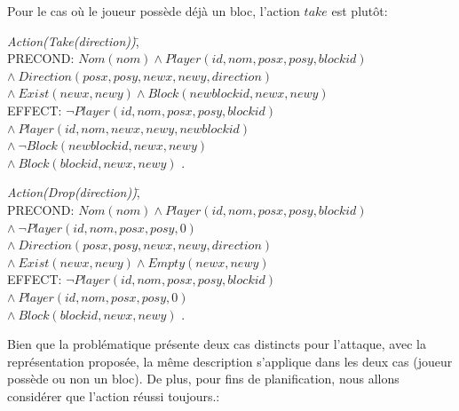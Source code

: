 \documentclass[12pt,english,frenchb,letterpaper]{article}
\begin{document}
Pour le cas où le joueur possède déjà un bloc, l'action $take$ est plutôt:
\begin{tabbing}
\textit{Action}\=\textit{(Take(direction))}\=,\\
\> PRECOND: \> $Nom(nom) \wedge Player(id,nom,posx,posy,blockid)$ \\ 
\> \> $  \wedge \ Direction(posx,posy,newx,newy,direction) $ \\
\> \> $   \wedge \ Exist(newx,newy) \wedge Block(newblockid,newx,newy) $ \\               
\> EFFECT: \>$ \lnot Player(id,nom,posx,posy,blockid) $ \\
\>  \> $\wedge\ Player(id,nom,newx,newy,newblockid)$ \\
\> \> $\wedge\ \lnot Block(newblockid,newx,newy) $ \\
\> \> $\wedge\ Block(blockid,newx,newy) $ .\\
\end{tabbing}

\begin{tabbing}
\textit{Action}\=\textit{(Drop(direction))}\=,\\
\> PRECOND: \> $Nom(nom) \wedge Player(id,nom,posx,posy,blockid)$ \\ 
\> \> $  \wedge \  \lnot Player(id,nom,posx,posy,0) $ \\
\> \> $  \wedge \ Direction(posx,posy,newx,newy,direction) $ \\
\> \> $   \wedge \ Exist(newx,newy) \wedge Empty(newx,newy) $ \\               
\> EFFECT: \>$ \lnot Player(id,nom,posx,posy,blockid) $ \\
\>  \> $\wedge\ Player(id,nom,posx,posy,0)$ \\
\> \> $\wedge\ Block(blockid,newx,newy) $ .\\
\end{tabbing}

Bien que la problématique présente deux cas distincts pour l'attaque, avec la représentation proposée, la même description s'applique dans les deux cas (joueur possède ou non un bloc).  De plus, pour fins de planification, nous allons considérer que l'action réussi toujours.:
\end{document}
